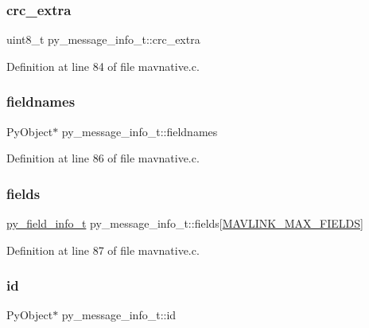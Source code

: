 \subsubsection{\texorpdfstring{crc\_extra}{crc\_extra}}
{\footnotesize\ttfamily uint8\+\_\+t py\+\_\+message\+\_\+info\+\_\+t\+::crc\+\_\+extra}



Definition at line 84 of file mavnative.\+c.

\mbox{\label{structpy__message__info__t_af1984cbd790c723d78663f15cf560542}} 
\subsubsection{\texorpdfstring{fieldnames}{fieldnames}}
{\footnotesize\ttfamily Py\+Object$\ast$ py\+\_\+message\+\_\+info\+\_\+t\+::fieldnames}



Definition at line 86 of file mavnative.\+c.

\mbox{\label{structpy__message__info__t_a6c8f190efd318675b963df07e77d5586}} 
\subsubsection{\texorpdfstring{fields}{fields}}
{\footnotesize\ttfamily \mbox{\hyperlink{structpy__field__info__t}{py\+\_\+field\+\_\+info\+\_\+t}} py\+\_\+message\+\_\+info\+\_\+t\+::fields\mbox{[}\mbox{\hyperlink{include__v2_80_2mavlink__types_8h_a27984b8945d505a56168731dc3cac63a}{M\+A\+V\+L\+I\+N\+K\+\_\+\+M\+A\+X\+\_\+\+F\+I\+E\+L\+DS}}\mbox{]}}



Definition at line 87 of file mavnative.\+c.

\mbox{\label{structpy__message__info__t_abd5a280b35c6534c5089c17f98712515}} 
\subsubsection{\texorpdfstring{id}{id}}
{\footnotesize\ttfamily Py\+Object$\ast$ py\+\_\+message\+\_\+info\+\_\+t\+::id}



